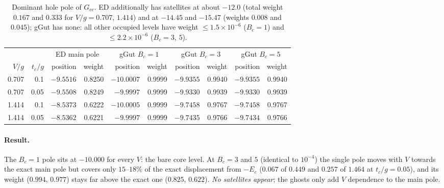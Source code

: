 \documentclass[11pt]{article}
\begin{document}
\begin{table}[!ht]
\centering\footnotesize
\setlength{\tabcolsep}{4pt}
\begin{tabular}{rr rr rr rr rr}
\toprule
 & & \multicolumn{2}{c}{ED main pole} & \multicolumn{2}{c}{gGut $B_c=1$} & \multicolumn{2}{c}{gGut $B_c=3$} & \multicolumn{2}{c}{gGut $B_c=5$}\\
$V/g$ & $t_c/g$ & position & weight & position & weight & position & weight & position & weight\\
\midrule
0.707 & 0.1  & $-9.5516$ & 0.8250 & $-10.0007$ & 0.9999 & $-9.9355$ & 0.9940 & $-9.9355$ & 0.9940\\
0.707 & 0.05 & $-9.5508$ & 0.8249 & $-9.9997$ & 0.9999 & $-9.9330$ & 0.9939 & $-9.9330$ & 0.9939\\
1.414 & 0.1  & $-8.5373$ & 0.6222 & $-10.0005$ & 0.9999 & $-9.7458$ & 0.9767 & $-9.7458$ & 0.9767\\
1.414 & 0.05 & $-8.5362$ & 0.6221 & $-9.9997$ & 0.9999 & $-9.7435$ & 0.9766 & $-9.7434$ & 0.9766\\
\bottomrule
\end{tabular}
\caption{Dominant hole pole of $G_{cc}$. ED additionally has satellites at about $-12.0$ (total weight $0.167$ and $0.333$ for $V/g=0.707$, $1.414$) and at $-14.45$ and $-15.47$ (weights $0.008$ and $0.045$);
gGut has none: all other occupied levels have weight $\le1.5\times10^{-6}$ ($B_c=1$) and $\le2.2\times10^{-6}$ ($B_c=3$, $5$).}
\label{tab:poles}
\end{table}

\paragraph{Result.} The $B_c=1$ pole sits at $-10.000$ for every $V$: the bare core level. At $B_c=3$ and $5$ (identical to $10^{-4}$) the single pole moves with $V$ towards the exact main pole but covers only $15$--$18\%$ of the exact displacement from $-E_c$
($0.067$ of $0.449$ and $0.257$ of $1.464$ at $t_c/g=0.05$), and its weight ($0.994$, $0.977$) stays far above the exact one ($0.825$, $0.622$). \emph{No satellites appear}; the ghosts only add $V$ dependence to the main pole.
\end{document}

